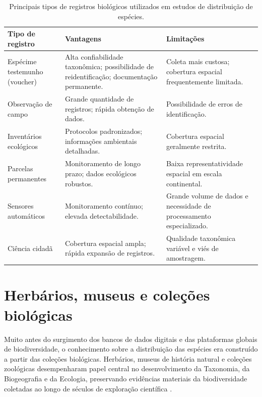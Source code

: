 \begin{table}[H]
	\centering
	\caption{Principais tipos de registros biológicos utilizados em estudos de distribuição de espécies.}
	\label{tab:tipos_registros}
	\begin{tabular}{p{3.5cm}p{5.5cm}p{5.5cm}}
		\toprule
		\textbf{Tipo de registro} &
		\textbf{Vantagens} &
		\textbf{Limitações} \\
		\midrule
		
		Espécime testemunho (voucher)
		&
		Alta confiabilidade taxonômica; possibilidade de reidentificação; documentação permanente.
		&
		Coleta mais custosa; cobertura espacial frequentemente limitada.
		
		\\
		
		Observação de campo
		&
		Grande quantidade de registros; rápida obtenção de dados.
		&
		Possibilidade de erros de identificação.
		
		\\
		
		Inventários ecológicos
		&
		Protocolos padronizados; informações ambientais detalhadas.
		&
		Cobertura espacial geralmente restrita.
		
		\\
		
		Parcelas permanentes
		&
		Monitoramento de longo prazo; dados ecológicos robustos.
		&
		Baixa representatividade espacial em escala continental.
		
		\\
		
		Sensores automáticos
		&
		Monitoramento contínuo; elevada detectabilidade.
		&
		Grande volume de dados e necessidade de processamento especializado.
		
		\\
		
		Ciência cidadã
		&
		Cobertura espacial ampla; rápida expansão de registros.
		&
		Qualidade taxonômica variável e viés de amostragem.
		
		\\
		\bottomrule
	\end{tabular}
\end{table}

\section{Herbários, museus e coleções biológicas}

Muito antes do surgimento dos bancos de dados digitais e das plataformas globais de biodiversidade, o conhecimento sobre a distribuição das espécies era construído a partir das coleções biológicas. Herbários, museus de história natural e coleções zoológicas desempenharam papel central no desenvolvimento da Taxonomia, da Biogeografia e da Ecologia, preservando evidências materiais da biodiversidade coletadas ao longo de séculos de exploração científica \parencite{suarez2004value}.

